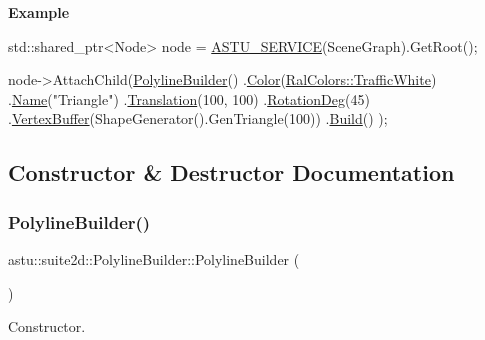 {\bfseries Example}


\begin{DoxyCode}
std::shared\_ptr<Node> node = \hyperlink{group__srv__group_ga42575546f01bf92989d08916564ffc66}{ASTU\_SERVICE}(SceneGraph).GetRoot();

node->AttachChild(\hyperlink{classastu_1_1suite2d_1_1PolylineBuilder_ae83654b1bd5d3720e73c0498d3036bd7}{PolylineBuilder}()
    .\hyperlink{classastu_1_1suite2d_1_1PolylineBuilder_a82a2c90c19baa65e7744251e3e4bc912}{Color}(\hyperlink{classastu_1_1RalColors_a18ad55749e0733dc1a412a97b7e40034a5ec8cffcddccd9b34880e5ebcf7b3b40}{RalColors::TrafficWhite})
    .\hyperlink{classastu_1_1suite2d_1_1SpatialBuilder_a9acc5dba2568c4c5e9ee1b4b04c3e490}{Name}(\textcolor{stringliteral}{"Triangle"})
    .\hyperlink{classastu_1_1suite2d_1_1SpatialBuilder_a4a39f76b987baf04c79ef1232ca3df7e}{Translation}(100, 100)
    .\hyperlink{classastu_1_1suite2d_1_1SpatialBuilder_aebb7300a60d30a4bf07723b977718e11}{RotationDeg}(45)
    .\hyperlink{classastu_1_1suite2d_1_1PolylineBuilder_ab18b7920a7899600091809d701a72352}{VertexBuffer}(ShapeGenerator().GenTriangle(100))
    .\hyperlink{classastu_1_1suite2d_1_1PolylineBuilder_aefeb3a1648e8d9a3279f994c60938d1e}{Build}()
  );
\end{DoxyCode}
 

\subsection{Constructor \& Destructor Documentation}
\mbox{\label{classastu_1_1suite2d_1_1PolylineBuilder_ae83654b1bd5d3720e73c0498d3036bd7}} 
\subsubsection{\texorpdfstring{Polyline\+Builder()}{PolylineBuilder()}}
{\footnotesize\ttfamily astu\+::suite2d\+::\+Polyline\+Builder\+::\+Polyline\+Builder (\begin{DoxyParamCaption}{ }\end{DoxyParamCaption})\hspace{0.3cm}{\ttfamily [inline]}}

Constructor. 

